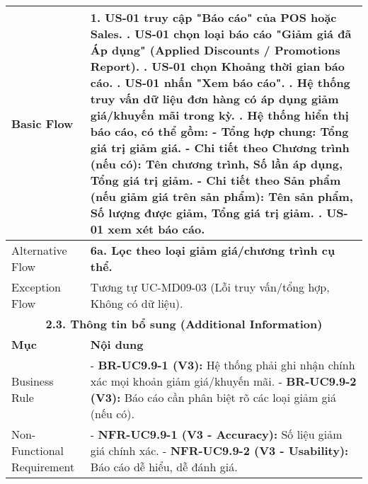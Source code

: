 \begin{longtable}{|m{4cm}|p{11cm}|}
Basic Flow & 1. US-01 truy cập "Báo cáo" của POS hoặc Sales. \newline 2. US-01 chọn loại báo cáo "Giảm giá đã Áp dụng" (Applied Discounts / Promotions Report). \newline 3. US-01 chọn Khoảng thời gian báo cáo. \newline 4. US-01 nhấn "Xem báo cáo". \newline 5. Hệ thống truy vấn dữ liệu đơn hàng có áp dụng giảm giá/khuyến mãi trong kỳ. \newline 6. Hệ thống hiển thị báo cáo, có thể gồm: \newline    - \textbf{Tổng hợp chung:} Tổng giá trị giảm giá. \newline    - \textbf{Chi tiết theo Chương trình (nếu có):} Tên chương trình, Số lần áp dụng, Tổng giá trị giảm. \newline    - \textbf{Chi tiết theo Sản phẩm (nếu giảm giá trên sản phẩm):} Tên sản phẩm, Số lượng được giảm, Tổng giá trị giảm. \newline 7. US-01 xem xét báo cáo. \\
\hline
Alternative Flow & \textbf{6a. Lọc theo loại giảm giá/chương trình cụ thể.} \\
\hline
Exception Flow & Tương tự UC-MD09-03 (Lỗi truy vấn/tổng hợp, Không có dữ liệu). \\
\hline
\multicolumn{2}{|c|}{\textbf{2.3. Thông tin bổ sung (Additional Information)}} \\
\hline
\textbf{Mục} & \textbf{Nội dung} \\
\hline
Business Rule & - \textbf{BR-UC9.9-1 (V3):} Hệ thống phải ghi nhận chính xác mọi khoản giảm giá/khuyến mãi. \newline - \textbf{BR-UC9.9-2 (V3):} Báo cáo cần phân biệt rõ các loại giảm giá (nếu có). \\
\hline
Non-Functional Requirement & - \textbf{NFR-UC9.9-1 (V3 - Accuracy):} Số liệu giảm giá chính xác. \newline - \textbf{NFR-UC9.9-2 (V3 - Usability):} Báo cáo dễ hiểu, dễ đánh giá. \\
\hline
\end{longtable}

